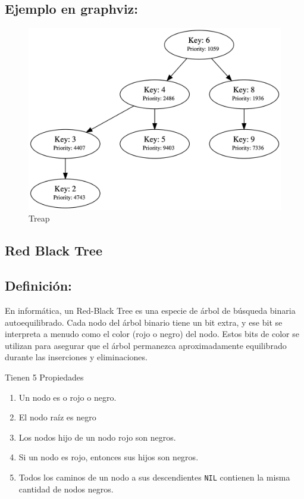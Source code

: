 \documentclass[]{article}
\begin{document}
	\subsection{Ejemplo en graphviz:}
		\begin{figure}[H]
			\centering\includegraphics[width=\textwidth]{graphviz/treap.png}
			\caption{Treap}
			\label{fig:Treap}
		\end{figure}
	\subsection{Red Black Tree}
		\subsection{Definición:}
			\par En informática, un Red-Black Tree es una especie de árbol de búsqueda binaria autoequilibrado. Cada nodo del árbol binario tiene un bit extra, y ese bit se interpreta a menudo como el color (rojo o negro) del nodo. Estos bits de color se utilizan para asegurar que el árbol permanezca aproximadamente equilibrado durante las inserciones y eliminaciones.\cite{cormenIntroductionAlgorithms2001}
			
			\par Tienen 5 Propiedades
				\begin{enumerate}
					\item Un nodo es o rojo o negro.
					\item El nodo raíz es negro 
					\item Los nodos hijo de un nodo rojo son negros.
					\item Si un nodo es rojo, entonces sus hijos son negros.
					\item Todos los caminos de un nodo a sus descendientes \texttt{NIL} contienen la misma cantidad de nodos negros.
				\end{enumerate}
\end{document}
